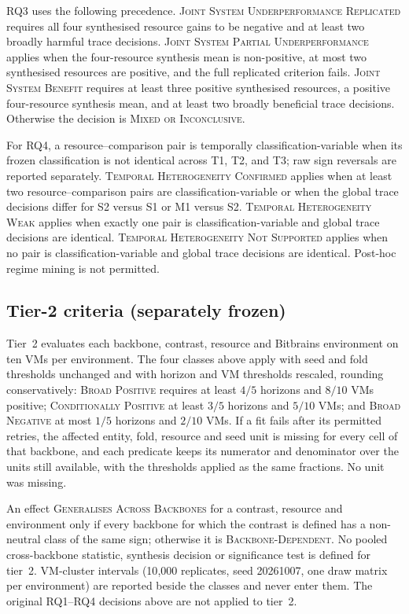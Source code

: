 \documentclass[a4paper,11pt]{article}
\begin{document}
RQ3 uses the following precedence.  \textsc{Joint System Underperformance
Replicated} requires all four synthesised resource gains to be negative and at
least two broadly harmful trace decisions.  \textsc{Joint System Partial
Underperformance} applies when the four-resource synthesis mean is non-positive,
at most two synthesised resources are positive, and the full replicated
criterion fails.  \textsc{Joint System Benefit} requires at least three
positive synthesised resources, a positive four-resource synthesis mean, and at
least two broadly beneficial trace decisions.  Otherwise the decision is
\textsc{Mixed or Inconclusive}.

For RQ4, a resource--comparison pair is temporally classification-variable when
its frozen classification is not identical across T1, T2, and T3; raw sign
reversals are reported separately.  \textsc{Temporal Heterogeneity Confirmed}
applies when at least two resource--comparison pairs are classification-variable
or when the global trace decisions differ for S2 versus S1 or M1 versus S2.
\textsc{Temporal Heterogeneity Weak} applies when exactly one pair is
classification-variable and global trace decisions are identical.
\textsc{Temporal Heterogeneity Not Supported} applies when no pair is
classification-variable and global trace decisions are identical.  Post-hoc
regime mining is not permitted.

\subsection*{Tier-2 criteria (separately frozen)}

Tier~2 evaluates each backbone, contrast, resource and Bitbrains
environment on ten VMs per environment. The four classes above apply with seed
and fold thresholds unchanged and with horizon and VM thresholds rescaled,
rounding conservatively: \textsc{Broad Positive} requires at least $4/5$
horizons and $8/10$ VMs positive; \textsc{Conditionally Positive} at least
$3/5$ horizons and $5/10$ VMs; and \textsc{Broad Negative} at most $1/5$
horizons and $2/10$ VMs. If a fit fails after its permitted retries, the
affected entity, fold, resource and seed unit is missing for every cell of
that backbone, and each predicate keeps its numerator and denominator over the
units still available, with the thresholds applied as the same fractions. No
unit was missing.

An effect \textsc{Generalises Across Backbones} for a contrast, resource and
environment only if every backbone for which the contrast is defined has a
non-neutral class of the same sign; otherwise it is \textsc{Backbone-Dependent}.
No pooled cross-backbone statistic, synthesis decision or significance test is
defined for tier~2. VM-cluster intervals (10{,}000 replicates, seed 20261007,
one draw matrix per environment) are reported beside the classes and never
enter them. The original RQ1--RQ4 decisions above are not applied to tier~2.
\clearpage
\end{document}
